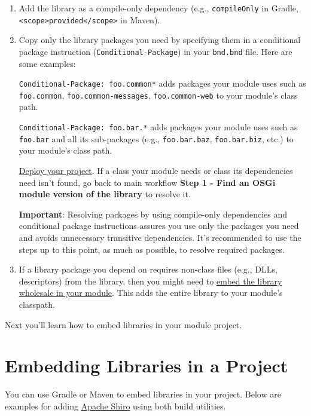 \begin{enumerate}
\def\labelenumi{\arabic{enumi}.}
\item
  Add the library as a compile-only dependency (e.g.,
  \texttt{compileOnly} in Gradle,
  \texttt{\textless{}scope\textgreater{}provided\textless{}/scope\textgreater{}}
  in Maven).
\item
  Copy only the library packages you need by specifying them in a
  conditional package instruction (\texttt{Conditional-Package}) in your
  \texttt{bnd.bnd} file. Here are some examples:

  \texttt{Conditional-Package:\ foo.common*} adds packages your module
  uses such as \texttt{foo.common}, \texttt{foo.common-messages},
  \texttt{foo.common-web} to your module's class path.

  \texttt{Conditional-Package:\ foo.bar.*} adds packages your module
  uses such as \texttt{foo.bar} and all its sub-packages (e.g.,
  \texttt{foo.bar.baz}, \texttt{foo.bar.biz}, etc.) to your module's
  class path.

  \href{/docs/7-2/reference/-/knowledge_base/r/deploying-a-project}{Deploy
  your project}. If a class your module needs or class its dependencies
  need isn't found, go back to main workflow \textbf{Step 1 - Find an
  OSGi module version of the library} to resolve it.

  \textbf{Important}: Resolving packages by using compile-only
  dependencies and conditional package instructions assures you use only
  the packages you need and avoids unnecessary transitive dependencies.
  It's recommended to use the steps up to this point, as much as
  possible, to resolve required packages.
\item
  If a library package you depend on requires non-class files (e.g.,
  DLLs, descriptors) from the library, then you might need to
  \hyperref[embedding-libraries-in-a-project]{embed the library
  wholesale in your module}. This adds the entire library to your
  module's classpath.
\end{enumerate}

Next you'll learn how to embed libraries in your module project.

\section{Embedding Libraries in a
Project}\label{embedding-libraries-in-a-project}

You can use Gradle or Maven to embed libraries in your project. Below
are examples for adding \href{https://shiro.apache.org}{Apache Shiro}
using both build utilities.

